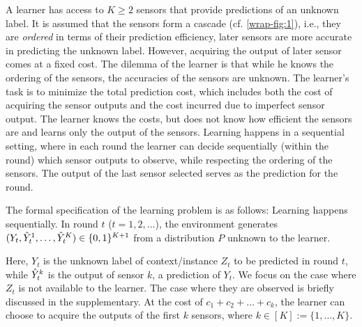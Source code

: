 %


A learner has access to $K\geq 2$ sensors that provide predictions
of an unknown label. 
 It is assumed that the sensors form a cascade (cf. \cref{wrap-fig:1}),
i.e., they are  \emph{ordered} in terms of their prediction efficiency,
later sensors are more accurate in predicting the unknown label.
However, acquiring the output of later sensor comes at a fixed cost.
The dilemma of the learner is that while he knows the ordering of the sensors,
the accuracies of the sensors are unknown.
The learner's task is to minimize the total prediction cost, which includes
both the cost of acquiring the sensor outputs and the cost incurred due to imperfect
sensor output.
The learner knows the costs, but does not know how efficient the sensors are
and learns only the output of the sensors.
Learning happens in a sequential setting, where in each round the learner can decide
sequentially (within the round) which sensor outputs to observe,
while respecting the ordering of the sensors.
The output of the last sensor selected serves as the prediction for the round.

The formal specification of the learning problem is as follows:
Learning happens sequentially.
In round $t$ ($t=1,2,\dots$), 
the environment generates 
$(Y_t,\hat{Y}_t^1,\dots,\hat{Y}_t^K)\in \{0,1\}^{K+1}$ from a distribution $P$ unknown to the learner.

Here, $Y_t$ is the unknown label of context/instance $Z_t$ to be predicted in round $t$, while $\hat{Y}_t^k$ is the output of sensor
$k$, a prediction of $Y_t$. We focus on the case where $Z_t$ is not available to the learner. The case where they are observed is briefly discussed in the supplementary. 
At the cost of $c_1+ c_2 + \dots + c_k$,
the learner can choose to acquire the outputs of the first $k$ sensors,
where $k\in [K] := \{1,\dots,K\}$. 

